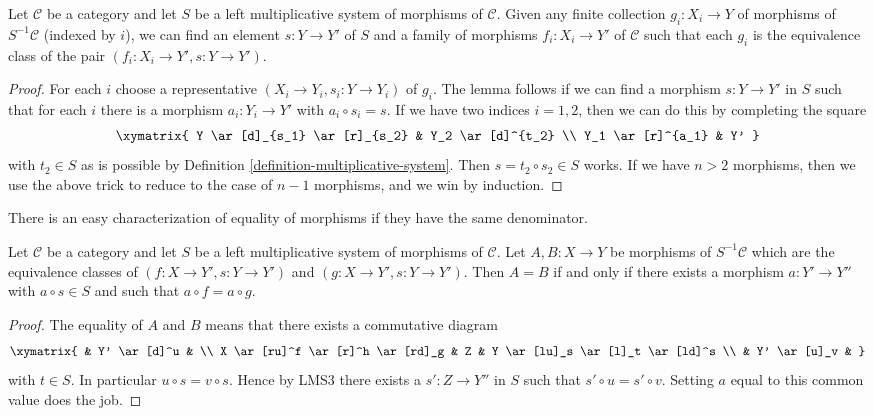\begin{lemma}
\label{lemma-morphisms-left-localization}
Let $\mathcal{C}$ be a category and let $S$ be a left multiplicative
system of morphisms of $\mathcal{C}$. Given any finite collection
$g_i : X_i \to Y$ of morphisms of $S^{-1}\mathcal{C}$
(indexed by $i$),
we can find an element $s : Y \to Y'$ of $S$ and
a family of morphisms $f_i : X_i \to Y'$ of $\mathcal{C}$ such that
each $g_i$ is the equivalence class of the pair
$(f_i : X_i \to Y', s : Y \to Y')$.
\end{lemma}

\begin{proof}
For each $i$ choose a representative $(X_i \to Y_i, s_i : Y \to Y_i)$
of $g_i$.
The lemma follows if we can find a morphism $s : Y \to Y'$ in $S$ such that
for each $i$ there is a morphism $a_i : Y_i \to Y'$ with
$a_i \circ s_i = s$. If we have two indices $i = 1, 2$, then we can
do this by completing the square
$$
\xymatrix{
Y \ar[d]_{s_1} \ar[r]_{s_2} & Y_2 \ar[d]^{t_2} \\
Y_1 \ar[r]^{a_1} & Y'
}
$$
with $t_2 \in S$ as is possible by
Definition \ref{definition-multiplicative-system}.
Then $s = t_2 \circ s_2 \in S$ works.
If we have $n > 2$ morphisms, then we use the above trick to reduce
to the case of $n - 1$ morphisms, and we win by induction.
\end{proof}

\noindent
There is an easy characterization of equality of morphisms if they
have the same denominator.

\begin{lemma}
\label{lemma-equality-morphisms-left-localization}
Let $\mathcal{C}$ be a category and let $S$ be a left multiplicative
system of morphisms of $\mathcal{C}$. Let $A, B : X \to Y$ be
morphisms of $S^{-1}\mathcal{C}$ which are the equivalence
classes of $(f : X \to Y', s : Y \to Y')$ and
$(g : X \to Y', s : Y \to Y')$. Then
$A = B$ if and only if there exists a morphism
$a : Y' \to Y''$ with $a \circ s \in S$ and
such that $a \circ f = a \circ g$.
\end{lemma}

\begin{proof}
The equality of $A$ and $B$ means that there exists a commutative diagram
$$
\xymatrix{
 & Y' \ar[d]^u & \\
X \ar[ru]^f \ar[r]^h \ar[rd]_g &
Z &
Y \ar[lu]_s \ar[l]_t \ar[ld]^s \\
& Y' \ar[u]_v &
}
$$
with $t \in S$. In particular $u \circ s = v \circ s$. Hence by LMS3 there
exists a $s' : Z \to Y''$ in $S$ such that $s' \circ u = s' \circ v$.
Setting $a$ equal to this common value does the job.
\end{proof}

